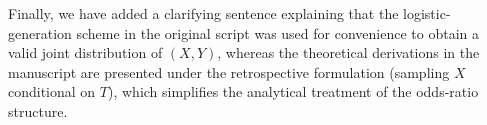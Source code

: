\documentclass[onecolumn,11pt]{IEEEtran}
\begin{document}
Finally, we have added a clarifying sentence explaining that the logistic-generation scheme in the original script was used for convenience to obtain a valid joint distribution of $(X,Y)$, whereas the theoretical derivations in the manuscript are presented under the retrospective formulation (sampling $X$ conditional on $T$), which simplifies the analytical treatment of the odds-ratio structure.

















\end{document}
